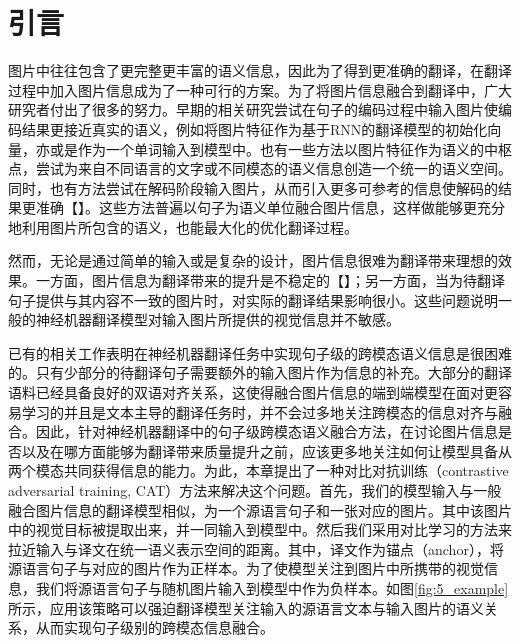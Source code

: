 \section{引言}
图片中往往包含了更完整更丰富的语义信息，因此为了得到更准确的翻译，在翻译过程中加入图片信息成为了一种可行的方案。为了将图片信息融合到翻译中，广大研究者付出了很多的努力。早期的相关研究尝试在句子的编码过程中输入图片使编码结果更接近真实的语义，例如将图片特征作为基于RNN的翻译模型的初始化向量\cite{18_DBLP:conf/emnlp/CalixtoL17,52_DBLP:journals/corr/ElliottFH15}，亦或是作为一个单词输入到模型中。也有一些方法以图片特征作为语义的中枢点，尝试为来自不同语言的文字或不同模态的语义信息创造一个统一的语义空间\cite{54_DBLP:journals/mt/NakayamaN17,68_DBLP:journals/corr/KirosSZ14}。同时，也有方法尝试在解码阶段输入图片，从而引入更多可参考的信息使解码的结果更准确【】。这些方法普遍以句子为语义单位融合图片信息，这样做能够更充分地利用图片所包含的语义，也能最大化的优化翻译过程。

然而，无论是通过简单的输入或是复杂的设计，图片信息很难为翻译带来理想的效果。一方面，图片信息为翻译带来的提升是不稳定的【】；另一方面，当为待翻译句子提供与其内容不一致的图片时，对实际的翻译结果影响很小。这些问题说明一般的神经机器翻译模型对输入图片所提供的视觉信息并不敏感。


已有的相关工作表明在神经机器翻译任务中实现句子级的跨模态语义信息是很困难的。只有少部分的待翻译句子需要额外的输入图片作为信息的补充。大部分的翻译语料已经具备良好的双语对齐关系，这使得融合图片信息的端到端模型在面对更容易学习的并且是文本主导的翻译任务时，并不会过多地关注跨模态的信息对齐与融合。因此，针对神经机器翻译中的句子级跨模态语义融合方法，在讨论图片信息是否以及在哪方面能够为翻译带来质量提升之前，应该更多地关注如何让模型具备从两个模态共同获得信息的能力。为此，本章提出了一种对比对抗训练（contrastive adversarial training, CAT）方法来解决这个问题。首先，我们的模型输入与一般融合图片信息的翻译模型相似，为一个源语言句子和一张对应的图片。其中该图片中的视觉目标被提取出来，并一同输入到模型中。然后我们采用对比学习的方法来拉近输入与译文在统一语义表示空间的距离。其中，译文作为锚点（anchor），将源语言句子与对应的图片作为正样本。为了使模型关注到图片中所携带的视觉信息，我们将源语言句子与随机图片输入到模型中作为负样本。如图\ref{fig:5_example}所示，应用该策略可以强迫翻译模型关注输入的源语言文本与输入图片的语义关系，从而实现句子级别的跨模态信息融合。

